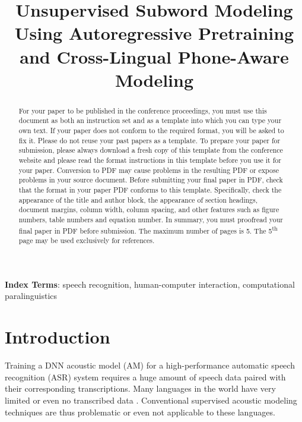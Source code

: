 \documentclass[a4paper]{article}
\title{Unsupervised Subword Modeling Using Autoregressive Pretraining and Cross-Lingual Phone-Aware Modeling}
\begin{document}
\maketitle
% 
\begin{abstract}
  For your paper to be published in the conference proceedings, you must use this document as both an instruction set and as a template into which you can type your own text. If your paper does not conform to the required format, you will be asked to fix it.
  Please do not reuse your past papers as a template. To prepare your paper for submission, please always download a fresh copy of this template from the conference website and please read the format instructions in this template before you use it for your paper.
  Conversion to PDF may cause problems in the resulting PDF or expose problems in your source document. Before submitting your final paper in PDF, check that the format in your paper PDF conforms to this template. Specifically, check the appearance of the title and author block, the appearance of section headings, document margins, column width, column spacing, and other features such as figure numbers, table numbers and equation number. In summary, you must proofread your final paper in PDF before submission.
    The maximum number of pages is 5. The 5\textsuperscript{th} page may be used exclusively for references. 

\end{abstract}
\noindent\textbf{Index Terms}: speech recognition, human-computer interaction, computational paralinguistics

\section{Introduction}

Training a DNN acoustic model (AM) for a high-performance automatic speech recognition (ASR) system requires a huge amount of speech data paired with their corresponding transcriptions. 
Many languages in the world have very limited or even no transcribed data \cite{dunbar2017zero}. 
Conventional supervised acoustic modeling techniques are thus problematic or even not applicable to these languages.
\end{document}
